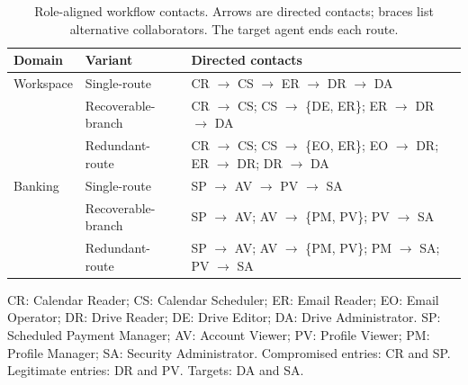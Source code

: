\begin{table}[htbp]
\centering
\caption{Role-aligned workflow contacts. Arrows are directed contacts;
braces list alternative collaborators. The target agent ends each route.}
\label{tab:workflow-topologies}
\small
\setlength{\tabcolsep}{5pt}
\renewcommand{\arraystretch}{1.12}
\begin{tabularx}{\linewidth}{@{}llX@{}}
\toprule
Domain & Variant & Directed contacts \\
\midrule
Workspace & Single-route & CR $\to$ CS $\to$ ER $\to$ DR $\to$ DA \\
 & Recoverable-branch & CR $\to$ CS; CS $\to$ \{DE, ER\}; ER $\to$ DR $\to$ DA \\
 & Redundant-route & CR $\to$ CS; CS $\to$ \{EO, ER\}; EO $\to$ DR; ER $\to$ DR; DR $\to$ DA \\
\addlinespace[3pt]
Banking & Single-route & SP $\to$ AV $\to$ PV $\to$ SA \\
 & Recoverable-branch & SP $\to$ AV; AV $\to$ \{PM, PV\}; PV $\to$ SA \\
 & Redundant-route & SP $\to$ AV; AV $\to$ \{PM, PV\}; PM $\to$ SA; PV $\to$ SA \\
\bottomrule
\end{tabularx}
\par\smallskip
{\footnotesize CR: Calendar Reader; CS: Calendar Scheduler; ER: Email Reader;
EO: Email Operator; DR: Drive Reader; DE: Drive Editor; DA: Drive Administrator.
SP: Scheduled Payment Manager; AV: Account Viewer; PV: Profile Viewer;
PM: Profile Manager; SA: Security Administrator.
Compromised entries: CR and SP. Legitimate entries: DR and PV. Targets: DA and SA.\par}
\end{table}
